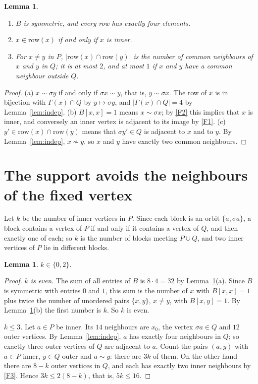 \documentclass[11pt,a4paper]{article}
\newtheorem{lemma}[theorem]{Lemma}
\theoremstyle{remark}
\newcommand{\sg}{\sigma}
\newcommand{\Nb}{\Gamma}
\begin{document}
\begin{lemma}\label{lem:B}
\begin{enumerate}[label=\textup{(\alph*)}]
\item $B$ is symmetric, and every row has exactly four elements.
\item $x\in\mathrm{row}(x)$ if and only if $x$ is inner.
\item For $x\ne y$ in $P$, $|\mathrm{row}(x)\cap\mathrm{row}(y)|$ is the number of common neighbours of $x$ and $y$
in $Q$; it is at most $2$, and at most $1$ if $x$ and $y$ have a common neighbour outside $Q$.
\end{enumerate}
\end{lemma}
\begin{proof}
(a) $x\sim\sg y$ if and only if $\sg x\sim y$, that is, $y\sim\sg x$. The row of $x$ is in bijection with
$\Nb(x)\cap Q$ by $y\mapsto\sg y$, and $|\Nb(x)\cap Q|=4$ by Lemma~\ref{lem:indep}.
(b) $B[x,x]=1$ means $x\sim\sg x$; by \ref{F2} this implies that $x$ is inner, and conversely an inner vertex is
adjacent to its image by \ref{F1}.
(c) $y'\in\mathrm{row}(x)\cap\mathrm{row}(y)$ means that $\sg y'\in Q$ is adjacent to $x$ and to $y$. By
Lemma~\ref{lem:indep}, $x\not\sim y$, so $x$ and $y$ have exactly two common neighbours.
\end{proof}

\section{The support avoids the neighbours of the fixed vertex}

Let $k$ be the number of inner vertices in $P$. Since each block is an orbit $\{a,\sg a\}$, a block contains a
vertex of $P$ if and only if it contains a vertex of $Q$, and then exactly one of each; so $k$ is the number of
blocks meeting $P\cup Q$, and two inner vertices of $P$ lie in different blocks.

\begin{lemma}\label{lem:k02}
$k\in\{0,2\}$.
\end{lemma}
\begin{proof}
\emph{$k$ is even.} The sum of all entries of $B$ is $8\cdot4=32$ by Lemma~\ref{lem:B}(a). Since $B$ is symmetric
with entries $0$ and $1$, this sum is the number of $x$ with $B[x,x]=1$ plus twice the number of unordered pairs
$\{x,y\}$, $x\ne y$, with $B[x,y]=1$. By Lemma~\ref{lem:B}(b) the first number is $k$. So $k$ is even.

\emph{$k\le3$.} Let $a\in P$ be inner. Its $14$ neighbours are $x_0$, the vertex $\sg a\in Q$ and $12$ outer
vertices. By Lemma~\ref{lem:indep}, $a$ has exactly four neighbours in $Q$; so exactly three outer vertices of $Q$
are adjacent to $a$. Count the pairs $(a,y)$ with $a\in P$ inner, $y\in Q$ outer and $a\sim y$: there are $3k$ of
them. On the other hand there are $8-k$ outer vertices in $Q$, and each has exactly two inner neighbours by
\ref{F3}. Hence $3k\le2(8-k)$, that is, $5k\le16$.
\end{proof}
\end{document}
